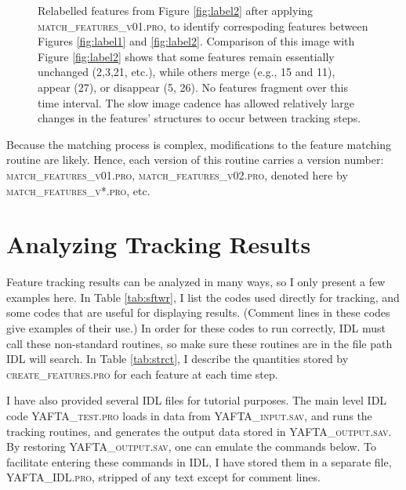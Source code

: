 \documentclass[12pt,preprint]{aastex}
\begin{document}
\begin{figure}
\caption{Relabelled features from Figure \ref{fig:label2} after
applying \textsc{match\_features\_v01.pro}, to identify correspoding
features between Figures \ref{fig:label1} and \ref{fig:label2}.
Comparison of this image with Figure \ref{fig:label2} shows that some
features remain essentially unchanged (2,3,21, etc.), while others
merge (e.g., 15 and 11), appear (27), or disappear (5, 26).  No
features fragment over this time interval.  The slow image cadence
has allowed relatively large changes in the features' structures to occur
between tracking steps.
\label{fig:match2}}
\end{figure}
%

\noindent
Because the matching process is complex, modifications to the feature
matching routine are likely.  Hence, each version of this routine
carries a version number: \textsc{match\_features\_v01.pro,
match\_features\_v02.pro}, denoted here by
\textsc{match\_features\_v*.pro}, etc.

\section{Analyzing Tracking Results}

\noindent
Feature tracking results can be analyzed in many ways, so I only
present a few examples here.  In Table \ref{tab:sftwr}, I list the
codes used directly for tracking, and some codes that are useful for displaying
results.  (Comment lines in these codes give examples of their use.)
In order for these codes to run correctly, IDL must call these 
non-standard routines, so make sure these routines are in the file
path IDL will search.  In Table \ref{tab:strct}, I describe the
quantities stored by \textsc{create\_features.pro} for each feature at
each time step.

\noindent
I have also provided several IDL files for tutorial purposes.  The
main level IDL code \textsc{YAFTA\_test.pro} loads in data from
\textsc{YAFTA\_input.sav}, and runs the tracking routines, and
generates the output data stored in \textsc{YAFTA\_output.sav}.  By
restoring \textsc{YAFTA\_output.sav}, one can emulate the commands
below.  To facilitate entering these commands in IDL, I have stored
them in a separate file, \textsc{YAFTA\_IDL.pro}, stripped of any text
except for comment lines.  
\end{document}
